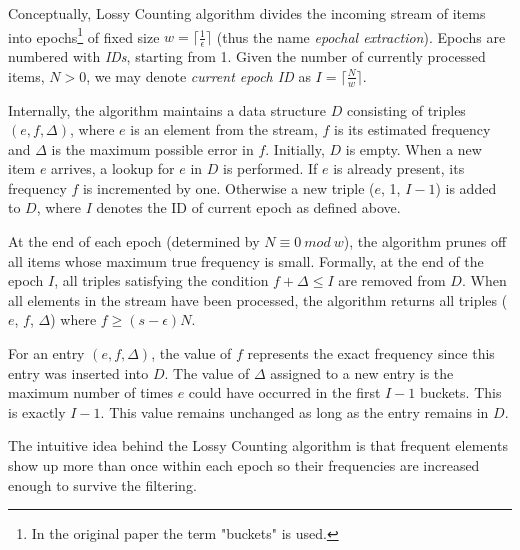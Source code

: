 Conceptually, Lossy Counting algorithm divides the incoming stream of items
into epochs\footnote{In the original paper the term "buckets" is used.}
of fixed size $w = \lceil \frac{1}{\epsilon} \rceil$
(thus the name \emph{epochal extraction}).
Epochs are numbered with \emph{IDs}, starting from 1.
Given the number of currently processed items, $N > 0$, we may denote
\emph{current epoch ID} as $I = \lceil \frac{N}{w} \rceil$.

Internally, the algorithm maintains a data structure $D$ consisting of triples
$(e, f, \Delta)$, where $e$ is an element from the stream, $f$ is its estimated
frequency and $\Delta$ is the maximum possible error in $f$.
Initially, $D$ is empty.
When a new item $e$ arrives, a lookup for $e$ in $D$ is performed.
If $e$ is already present, its frequency $f$ is incremented by one.
Otherwise a new triple ($e$, 1, $I-1$) is added to $D$,
where $I$ denotes the ID of current epoch as defined above.

At the end of each epoch (determined by $N \equiv 0~mod~w$), the algorithm
prunes off all items whose maximum true frequency is small.
Formally, at the end of the epoch $I$, all triples satisfying the condition
$f + \Delta \leq I$ are removed from $D$.
When all elements in the stream have been processed, the algorithm returns all
triples ($e$, $f$, $\Delta$) where $f \geq (s-\epsilon)N$.

For an entry $(e, f, \Delta)$, the value of $f$ represents the exact frequency
since this entry was inserted into $D$.
The value of $\Delta$ assigned to a new entry is the maximum number of times
$e$ could have occurred in the first $I-1$ buckets. This is exactly $I-1$.
This value remains unchanged as long as the entry remains in $D$.

The intuitive idea behind the Lossy Counting algorithm is that frequent elements
show up more than once within each epoch so their frequencies are increased enough
to survive the filtering.
